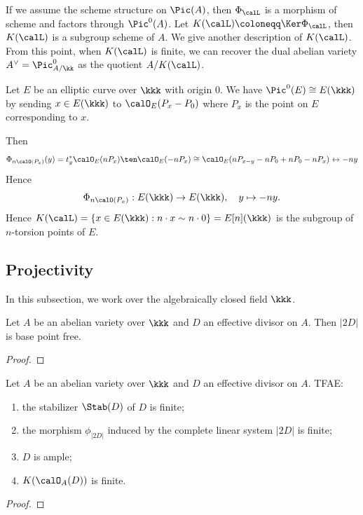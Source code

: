    If we assume the scheme structure on \(\Pic(A)\), then \(\Phi_\calL\) is a morphism of scheme and factors through \(\Pic^0(A)\).
    Let \(K(\calL) \coloneqq \Ker \Phi_\calL\), then \(K(\calL)\) is a subgroup scheme of \(A\).
    We give another description of \(K(\calL)\).
    From this point, when \(K(\calL)\) is finite, we can recover the dual abelian variety \(A^\vee = \Pic^0_{A/\kk}\) as the quotient \(A/K(\calL)\).

    \begin{example}\label{eg:describe_Phi_on_elliptic_curves}
        Let \(E\) be an elliptic curve over \(\kkk\) with origin \(0\).
        We have \(\Pic^0(E) \cong E(\kkk)\) by sending \(x \in E(\kkk)\) to \(\calO_E(P_x - P_0)\) where \(P_x\) is the point on \(E\) corresponding to \(x\).

        Then 
        \[ \Phi_{n\calO(P_x)}(y) = t_y^*\calO_E(nP_x) \ten \calO_E(-nP_x) \cong \calO_E(nP_{x-y} - nP_0 + nP_0 - nP_x) \leftrightarrow -ny \]
        Hence 
        \[ \Phi_{n\calO(P_x)}: E(\kkk) \to E(\kkk), \quad y \mapsto -ny. \]
        Hence \(K(\calL) = \{ x \in E(\kkk) : n \cdot x \sim n \cdot 0 \} = E[n](\kkk)\) is the subgroup of \(n\)-torsion points of \(E\).
    \end{example}


\subsection{Projectivity}

    In this subsection, we work over the algebraically closed field \(\kkk\).

    \begin{proposition}\label{prop:2D_is_base_point_free}
        Let \(A\) be an abelian variety over \(\kkk\) and \(D\) an effective divisor on \(A\).
        Then \(|2D|\) is base point free.
    \end{proposition}
    \begin{proof}
    \end{proof}

    \begin{theorem}\label{thm:ample_criteria_for_abelian_varieties}
        Let \(A\) be an abelian variety over \(\kkk\) and \(D\) an effective divisor on \(A\).
        TFAE:
        \begin{enumerate}
            \item the stabilizer \(\Stab(D)\) of \(D\) is finite;
            \item the morphism \(\phi_{|2D|}\) induced by the complete linear system \(|2D|\) is finite;
            \item \(D\) is ample;
            \item \(K(\calO_A(D))\) is finite.
        \end{enumerate}
    \end{theorem}
    \begin{proof}
    \end{proof}

